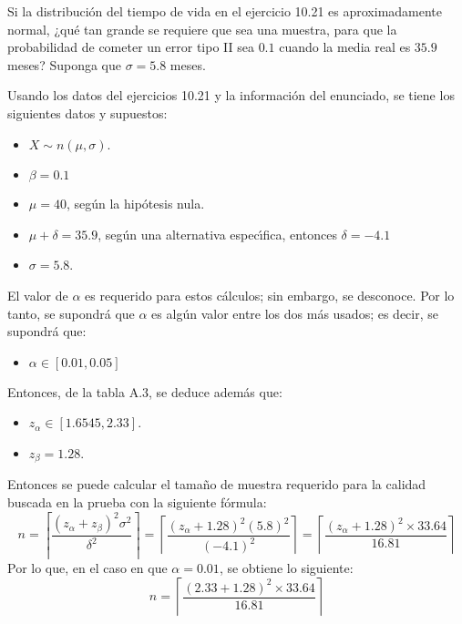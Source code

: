 \begin{enunciado}
 Si la distribuci\'on del tiempo de vida en el ejercicio 10.21 es aproximadamente normal, ¿qu\'e tan grande se requiere que sea una muestra, para que la probabilidad de cometer un error tipo II sea $0.1$ cuando la media real es $35.9$ meses? Suponga que $\sigma = 5.8$ meses.
\end{enunciado}

\begin{solucion}
 Usando los datos del ejercicios 10.21
 y la informaci\'on del enunciado,
 se tiene los siguientes datos y supuestos:
 \begin{itemize}
  \item $X \sim n\left( \mu, \sigma \right)$.
  \item $\beta = 0.1$
  \item $\mu = 40$, seg\'un la hip\'otesis nula.
  \item $\mu + \delta = 35.9$,
  seg\'un una alternativa espec\'{\i}fica,
  entonces $\delta = -4.1$
  \item $\sigma = 5.8$.
 \end{itemize}
 El valor de $\alpha$ es requerido para estos c\'alculos; sin embargo, se desconoce. Por lo tanto, se supondr\'a que $\alpha$ es alg\'un valor entre los dos m\'as usados; es decir, se supondr\'a que:
 \begin{itemize}
  \item $\alpha \in [ 0.01, 0.05 ]$
 \end{itemize}
 Entonces, de la tabla A.3, se deduce adem\'as que:
 \begin{itemize}
  \item $z_{\alpha} \in [ 1.6545, 2.33 ]$.
  \item $z_{\beta} = 1.28$.
 \end{itemize}
 Entonces se puede calcular el tama\~no de muestra requerido
 para la calidad buscada en la prueba con la siguiente f\'ormula:
 \begin{equation*}
  n = \left\lceil
  \frac{\left( z_{\alpha}+z_{\beta}\right)^2 \sigma^2}{\delta^2}
  \right\rceil
  = \left\lceil
  \frac{\left(z_{\alpha} + 1.28\right)^2 (5.8)^2}{(-4.1)^2}
  \right\rceil
  = \left\lceil \frac{\left(z_{\alpha} + 1.28\right)^2\times 33.64}{16.81} \right\rceil
 \end{equation*}
 Por lo que, en el caso en que $\alpha = 0.01$, se obtiene lo siguiente:
 \begin{equation*}
  n = \left\lceil \frac{(2.33 + 1.28)^2 \times 33.64}{16.81} \right\rceil

\end{equation*}
\end{solucion}
